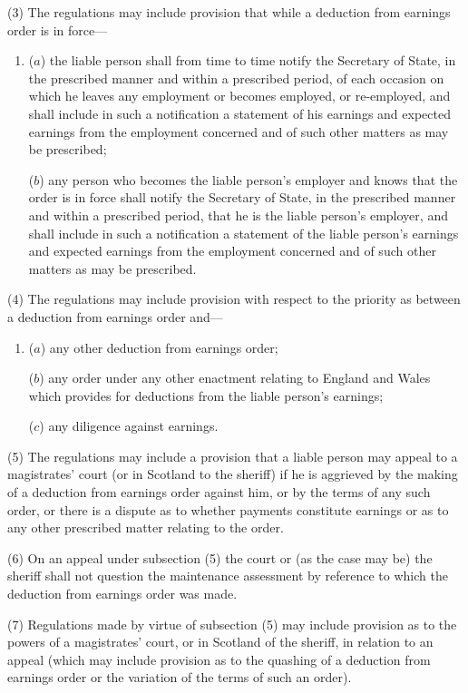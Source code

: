 \documentclass[12pt,a4paper]{article}
\begin{document}
(3) The regulations may include provision that while a deduction from earnings order is in force—
\begin{enumerate}\item[]
($a$) the liable person shall from time to time notify the Secretary of State, in the prescribed manner and within a prescribed period, of each occasion on which he leaves any employment or becomes employed, or re-employed, and shall include in such a notification a statement of his earnings and expected earnings from the employment concerned and of such other matters as may be prescribed;

($b$) any person who becomes the liable person’s employer and knows that the order is in force shall notify the Secretary of State, in the prescribed manner and within a prescribed period, that he is the liable person’s employer, and shall include in such a notification a statement of the liable person’s earnings and expected earnings from the employment concerned and of such other matters as may be prescribed.
\end{enumerate}

(4) The regulations may include provision with respect to the priority as between a deduction from earnings order and—
\begin{enumerate}\item[]
($a$) any other deduction from earnings order;

($b$) any order under any other enactment relating to England and Wales which provides for deductions from the liable person’s earnings;

($c$) any diligence against earnings.
\end{enumerate}

(5) The regulations may include a provision that a liable person may appeal to a magistrates' court (or in Scotland to the sheriff) if he is aggrieved by the making of a deduction from earnings order against him, or by the terms of any such order, or there is a dispute as to whether payments constitute earnings or as to any other prescribed matter relating to the order.

(6) On an appeal under subsection (5)  the court or (as the case may be) the sheriff shall not question the maintenance assessment by reference to which the deduction from earnings order was made.

(7) Regulations made by virtue of subsection (5)  may include provision as to the powers of a magistrates' court, or in Scotland of the sheriff, in relation to an appeal (which may include provision as to the quashing of a deduction from earnings order or the variation of the terms of such an order).
\end{document}

